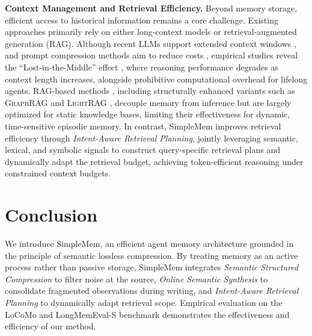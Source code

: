 \documentclass{article}
\newcommand{\ours}{SimpleMem}
\theoremstyle{plain}
\theoremstyle{definition}
\theoremstyle{remark}
\begin{document}
\textbf{Context Management and Retrieval Efficiency.} Beyond memory storage, efficient access to historical information remains a core challenge. Existing approaches primarily rely on either long-context models or retrieval-augmented generation (RAG). Although recent LLMs support extended context windows \cite{gpt5,blogGemini25,claude37}, and prompt compression methods aim to reduce costs \cite{jiang2023llmlingua,liskavetsky2025compressor}, empirical studies reveal the “Lost-in-the-Middle” effect \cite{liu2023lost,kuratov2024case}, where reasoning performance degrades as context length increases, alongside prohibitive computational overhead for lifelong agents. RAG-based methods \cite{lewis2020retrieval,asai2023self,jiang2023active}, including structurally enhanced variants such as \textsc{GraphRAG} \cite{graphrag,zhao20252graphrag} and \textsc{LightRAG} \cite{guo2024lightrag}, decouple memory from inference but are largely optimized for static knowledge bases, limiting their effectiveness for dynamic, time-sensitive episodic memory. 
In contrast, \ours{} improves retrieval efficiency through \emph{Intent-Aware Retrieval Planning}, jointly leveraging semantic, lexical, and symbolic signals to construct query-specific retrieval plans and dynamically adapt the retrieval budget, achieving token-efficient reasoning under constrained context budgets.

\vspace{-0.5em}
\section{Conclusion}
\vspace{-0.5em}
We introduce SimpleMem, an efficient agent memory architecture grounded in the principle of semantic lossless compression. By treating memory as an active process rather than passive storage, SimpleMem integrates \textit{Semantic Structured Compression} to filter noise at the source, \textit{Online Semantic Synthesis} to consolidate fragmented observations during writing, and \textit{Intent-Aware Retrieval Planning} to dynamically adapt retrieval scope. 
Empirical evaluation on the LoCoMo and LongMemEval-S benchmark demonstrates the effectiveness and efficiency of our method.
\end{document}
